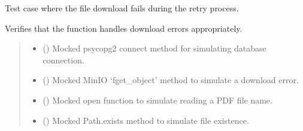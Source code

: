 \documentclass[letterpaper,10pt,english]{sphinxmanual}
\begin{document}
\begin{fulllineitems}
\label{\detokenize{test.data_storage:test.data_storage.test_retry_failed_reports.test_download_error}}
\pysigstartsignatures
\pysiglinewithargsret
{}
{\sphinxparamcomma {}\sphinxparamcomma {}\sphinxparamcomma {}}
{}
\pysigstopsignatures
\sphinxAtStartPar
Test case where the file download fails during the retry process.

\sphinxAtStartPar
Verifies that the function handles download errors appropriately.
\begin{quote}\begin{description}
\begin{itemize}
\item {} 
\sphinxAtStartPar
{} () \textendash{} Mocked psycopg2 connect method for simulating database connection.

\item {} 
\sphinxAtStartPar
{} () \textendash{} Mocked MinIO ‘fget\_object’ method to simulate a download error.

\item {} 
\sphinxAtStartPar
{} () \textendash{} Mocked open function to simulate reading a PDF file name.

\item {} 
\sphinxAtStartPar
{} () \textendash{} Mocked Path.exists method to simulate file existence.

\end{itemize}

\end{description}\end{quote}

\end{fulllineitems}

\end{document}
